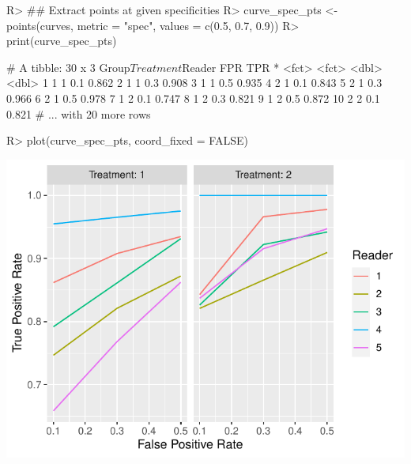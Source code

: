 \documentclass[
]{jss}
\begin{document}
\begin{CodeChunk}
\begin{CodeInput}
R> ## Extract points at given specificities
R> curve_spec_pts <- points(curves, metric = "spec", values = c(0.5, 0.7, 0.9))
R> print(curve_spec_pts)
\end{CodeInput}
\begin{CodeOutput}
# A tibble: 30 x 3
   Group$Treatment $Reader   FPR   TPR
 * <fct>           <fct>   <dbl> <dbl>
 1 1               1         0.1 0.862
 2 1               1         0.3 0.908
 3 1               1         0.5 0.935
 4 2               1         0.1 0.843
 5 2               1         0.3 0.966
 6 2               1         0.5 0.978
 7 1               2         0.1 0.747
 8 1               2         0.3 0.821
 9 1               2         0.5 0.872
10 2               2         0.1 0.821
# ... with 20 more rows
\end{CodeOutput}
\begin{CodeInput}
R> plot(curve_spec_pts, coord_fixed = FALSE)
\end{CodeInput}


\begin{center}\includegraphics{MRMCaov_files/figure-latex/using_curves_points-1} \end{center}


\end{CodeChunk}
\end{document}
